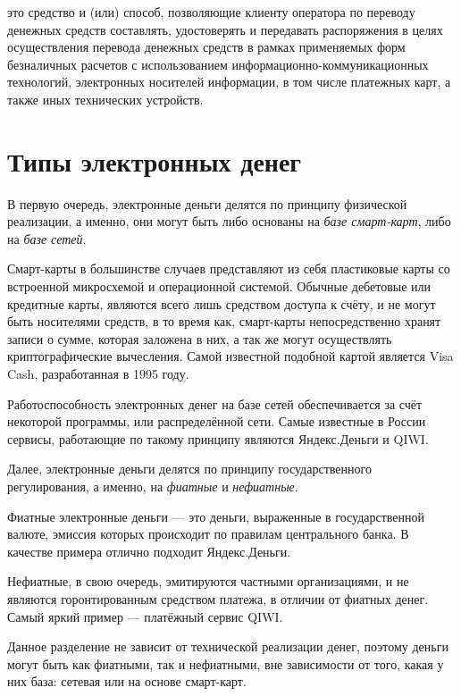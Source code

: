 \documentclass[12pt,a4paper]{article}
\begin{document}
\begin{displayquote}
	это средство и (или) способ, позволяющие клиенту оператора по переводу денежных средств составлять, удостоверять и передавать распоряжения в целях осуществления перевода денежных средств в рамках применяемых форм безналичных расчетов с использованием информационно-коммуникационных технологий, электронных носителей информации, в том числе платежных карт, а также иных технических устройств.
\end{displayquote}

\section{Типы электронных денег}

В первую очередь, электронные деньги делятся по принципу физической реализации, а именно, они могут быть либо основаны на \textit{базе смарт-карт}, либо на \textit{базе сетей}. 

Смарт-карты в большинстве случаев представляют из себя пластиковые карты со встроенной микросхемой и операционной системой. Обычные дебетовые или кредитные карты, являются всего лишь средством доступа к счёту, и не могут быть носителями средств, в то время как, смарт-карты непосредственно хранят записи о сумме, которая заложена в них, а так же могут осуществлять криптографические вычесления. Самой известной подобной картой является Visa Cash, разработанная в 1995 году.

Работоспособность электронных денег на базе сетей обеспечивается за счёт некоторой программы, или распределённой сети. Самые известные в России сервисы, работающие по такому принципу являются Яндекс.Деньги и QIWI.

Далее, электронные деньги делятся по принципу государственного регулирования, а именно, на \textit{фиатные} и \textit{нефиатные}.

Фиатные электронные деньги --- это деньги, выраженные в государственной валюте, эмиссия которых происходит по правилам центрального банка. В качестве примера отлично подходит Яндекс.Деньги.

Нефиатные, в свою очередь, эмитируются частными организациями, и не являются горонтированным средством платежа, в отличии от фиатных денег. Самый яркий пример --- платёжный сервис QIWI.

Данное разделение не зависит от технической реализации денег, поэтому деньги могут быть как фиатными, так и нефиатными, вне зависимости от того, какая у них база: сетевая или на основе смарт-карт.
\end{document}
